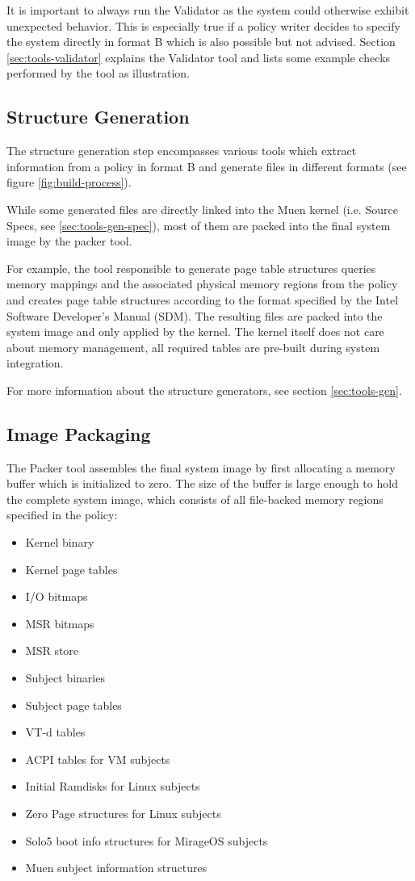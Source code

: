 \documentclass[a4paper,twoside,titlepage]{article}
\begin{document}
It is important to always run the Validator as the system could otherwise
exhibit unexpected behavior. This is especially true if a policy writer decides
to specify the system directly in format B which is also possible but not
advised. Section \ref{sec:tools-validator} explains the Validator tool and
lists some example checks performed by the tool as illustration.

\subsection{Structure Generation}
The structure generation step encompasses various tools which extract
information from a policy in format B and generate files in different formats
(see figure \ref{fig:build-process}).

While some generated files are directly linked into the Muen kernel (i.e.
Source Specs, see \ref{sec:tools-gen-spec}), most of them are packed into the
final system image by the packer tool.

For example, the tool responsible to generate page table structures queries
memory mappings and the associated physical memory regions from the policy and
creates page table structures according to the format specified by the Intel
Software Developer's Manual (SDM). The resulting files are packed into the
system image and only applied by the kernel. The kernel itself does not care
about memory management, all required tables are pre-built during system
integration.

For more information about the structure generators, see section
\ref{sec:tools-gen}.

\subsection{Image Packaging}
The Packer tool assembles the final system image by first allocating a memory
buffer which is initialized to zero. The size of the buffer is large enough to
hold the complete system image, which consists of all file-backed memory
regions specified in the policy:

\begin{itemize}
	\item Kernel binary
	\item Kernel page tables
	\item I/O bitmaps
	\item MSR bitmaps
	\item MSR store
	\item Subject binaries
	\item Subject page tables
	\item VT-d tables
	\item ACPI tables for VM subjects
	\item Initial Ramdisks for Linux subjects
	\item Zero Page structures for Linux subjects
	\item Solo5 boot info structures for MirageOS subjects
	\item Muen subject information structures
\end{itemize}
\end{document}
